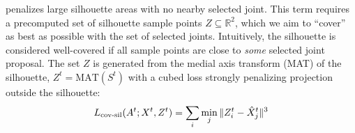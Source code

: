 \def\silhouette{S}

 penalizes large silhouette areas with no nearby selected joint. This term requires a precomputed set of silhouette sample points $Z \subseteq \mathbb{R}^2$, which we aim to ``cover'' as best as possible with the set of selected joints. Intuitively, the silhouette is considered well-covered if all sample points are close to \emph{some} selected joint proposal. The set $Z$ is generated from the medial axis transform (MAT)\cite{blum1967transformation} of the silhouette, $Z^{t} = \text{MAT}(\silhouette^{t})$
with a cubed loss strongly penalizing projection outside the silhouette:
\begin{equation}
L_{\textrm{cov-sil}}(A^{t};X^{t},Z^{t}) = \sum_{i}\min_{j}\|Z_{i}^{t} - \hat{X}_{j}^{t}\|^3
\end{equation}

